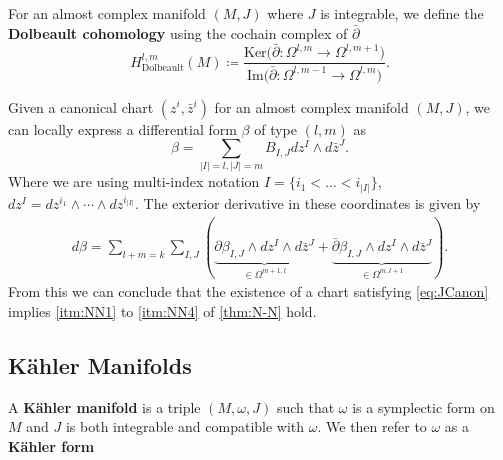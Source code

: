 \documentclass[11pt, final]{article}
\begin{document}
\begin{definition}
	For an almost complex manifold $(M,J)$ where $J$ is integrable, we define the \textbf{Dolbeault cohomology} using the cochain complex of $\bar{\partial}$
		\begin{equation}
			H^{l,m}_{\mathrm{Dolbeault}}(M) \coloneqq \frac{
				\mathrm{Ker} \Big( \bar{\partial}: \Omega^{l,m} \to \Omega^{l,m+1} \Big)
			}{
				\mathrm{Im} \Big( \bar{\partial}: \Omega^{l,m-1} \to \Omega^{l,m} \Big)
			}.
		\end{equation}
\end{definition}
\begin{remark}
	Given a canonical chart $(z^i,\bar{z}^i)$ for an almost complex manifold $(M,J)$, we can locally express a differential form $\beta$ of type $(l,m)$ as
		\begin{equation}
			\beta = \sum_{|I| = l, |J| = m} B_{I,J} dz^I \wedge d\bar{z}^J.
		\end{equation}
	Where we are using multi-index notation $I = \{ i_1 < \ldots < i_{|I|} \}$, $dz^I = dz^{i_1} \wedge \cdots \wedge dz^{i_{|I|}}$.
	The exterior derivative in these coordinates is given by
		\begin{align}
			d\beta = \sum_{l+m=k} \sum_{I,J} \left( 
			\underbrace{
					 \partial \beta_{I,J} \wedge dz^I \wedge d\bar{z}^J
			}_{\in \Omega^{m+1,l}} + \underbrace{
				\bar{\partial} \beta_{I,J} \wedge dz^I \wedge d\bar{z}^J
			}_{\in \Omega^{m,l+1}} \right).
		\end{align}
	From this we can conclude that the existence of a chart satisfying \eqref{eq:JCanon} implies \ref{itm:NN1} to \ref{itm:NN4} of \autoref{thm:N-N} hold.
\end{remark}

\subsection{K\"ahler Manifolds}

\begin{definition}
	A \textbf{K\"ahler manifold} is a triple $(M,\omega,J)$ such that $\omega$ is a symplectic form on $M$ and $J$ is both integrable and compatible with $\omega$. We then refer to $\omega$ as a \textbf{K\"ahler form}
\end{definition}
\end{document}
